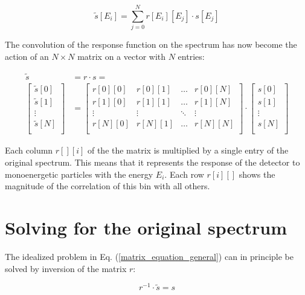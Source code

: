 \documentclass{article}
\begin{document}
\begin{equation}
	\label{convolution_discrete}
	\tilde{s}[E_i] = \sum_{j = 0}^{N} r[E_i][E_j] \cdot s[E_j]
\end{equation}

The convolution of the response function on the spectrum has now become the action of an $N \times N$ matrix on a vector with $N$ entries:

\begin{align}
	\label{matrix_equation_general}
	\tilde{s} &= r \cdot s = \\
	\label{matrix_equation_explicit}
	\left[ 
		\begin{array}{c}
			\tilde{s}[0] \\
			\tilde{s}[1] \\
			\vdots	\\
			\tilde{s}[N] \\
		\end{array}
	\right]
	&= 
	\begin{bmatrix}
		r[0][0] & r[0][1] & \hdots & r[0][N] \\
		r[1][0] & r[1][1] & \hdots & r[1][N] \\
		\vdots  & \vdots  & \ddots & \vdots  \\
		r[N][0] & r[N][1] & \hdots & r[N][N] \\
	\end{bmatrix}
	\cdot
	\left[ 
		\begin{array}{c}
			s[0] \\
			s[1] \\
			\vdots	\\
			s[N] \\
		\end{array}
	\right]
\end{align}

Each column $r[][i]$ of the the matrix is multiplied by a single entry of the original spectrum. This means that it represents the response of the detector to monoenergetic particles with the energy $E_i$.
Each row $r[i][]$ shows the magnitude of the correlation of this bin with all others.

\section{Solving for the original spectrum}

The idealized problem in Eq. (\ref{matrix_equation_general}) can in principle be solved by inversion of the matrix $r$:

\begin{equation}
	\label{matrix_equation_solved}
	r^{-1} \cdot \tilde{s} = s
\end{equation}
\end{document}
